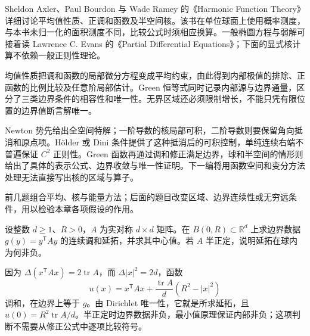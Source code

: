 \ProseParagraphBreak

Sheldon Axler、Paul Bourdon 与 Wade Ramey 的《Harmonic Function Theory》\cite[Chapters 1, 3, and 7]{Axler2001Harmonic}详细讨论平均值性质、正调和函数及半空间核。该书在单位球面上使用概率测度，与本书未归一化的面积测度不同，比较公式时须相应换算。一般椭圆方程与弱解可接着读 Lawrence C. Evans 的《Partial Differential Equations》\cite{Evans2010Partial}；下面的显式核计算不依赖一般正则性理论。






\begin{chaptersummary}
均值性质把调和函数的局部微分方程变成平均约束，由此得到内部极值的排除、正函数的比例比较及任意阶局部估计。Green 恒等式同时记录内部源与边界通量，区分了三类边界条件的相容性和唯一性。无界区域还必须限制增长，不能只凭有限位置的边界值断言解唯一。

\ProseParagraphBreak

Newton 势先给出全空间特解；一阶导数的核局部可积，二阶导数则要保留角向抵消和原点项。Hölder 或 Dini 条件提供了这种抵消后的可积控制，单纯连续右端不普遍保证 \(C^2\) 正则性。Green 函数再通过调和修正满足边界，球和半空间的情形则给出了具体的表示公式、边界收敛与唯一性证明。下一编将用函数空间和变分方法处理无法直接写出核的区域与算子。
\end{chaptersummary}

\BookExercises

前几题组合平均、核与能量方法；后面的题目改变区域、边界连续性或无穷远条件，用以检验本章各项假设的作用。

\begin{exercise}\label{b2:ex:13-quadratic-boundary}
设整数 \(d\geq1\)、\(R>0\)，\(A\) 为实对称 \(d\times d\) 矩阵。在 \(B(0,R)\subset\mathbb R^d\) 上求边界数据 \(g(y)=y^{\mathsf T}Ay\) 的连续调和延拓，并求其中心值。若 \(A\) 半正定，说明延拓在球内为何非负。
\end{exercise}
\begin{solution}
因为 \(\Delta(x^{\mathsf T}Ax)=2\operatorname{tr}A\)，而 \(\Delta|x|^2=2d\)，函数
\[
 u(x)=x^{\mathsf T}Ax+\dfrac{\operatorname{tr}A}{d}(R^2-|x|^2)
\]
调和，在边界上等于 \(g\)。由 Dirichlet 唯一性，它就是所求延拓，且 \(u(0)=R^2\operatorname{tr}A/d\)。半正定时边界数据非负，最小值原理保证内部非负；这项判断不需要从修正公式中逐项比较符号。
\end{solution}

